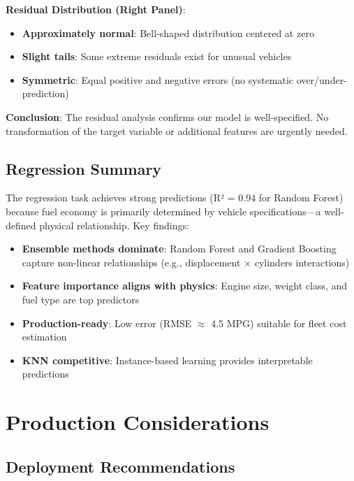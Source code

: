 \documentclass[11pt,a4paper]{article}
\begin{document}
\textbf{Residual Distribution (Right Panel)}:
\begin{itemize}[leftmargin=*]
    \item \textbf{Approximately normal}: Bell-shaped distribution centered at zero
    \item \textbf{Slight tails}: Some extreme residuals exist for unusual vehicles
    \item \textbf{Symmetric}: Equal positive and negative errors (no systematic over/under-prediction)
\end{itemize}

\textbf{Conclusion}: The residual analysis confirms our model is well-specified. No transformation of the target variable or additional features are urgently needed.

\subsection{Regression Summary}

The regression task achieves strong predictions (R² = 0.94 for Random Forest) because fuel economy is primarily determined by vehicle specifications---a well-defined physical relationship. Key findings:

\begin{itemize}[leftmargin=*]
    \item \textbf{Ensemble methods dominate}: Random Forest and Gradient Boosting capture non-linear relationships (e.g., displacement $\times$ cylinders interactions)
    \item \textbf{Feature importance aligns with physics}: Engine size, weight class, and fuel type are top predictors
    \item \textbf{Production-ready}: Low error (RMSE $\approx$ 4.5 MPG) suitable for fleet cost estimation
    \item \textbf{KNN competitive}: Instance-based learning provides interpretable predictions
\end{itemize}

\section{Production Considerations}

\subsection{Deployment Recommendations}
\end{document}
